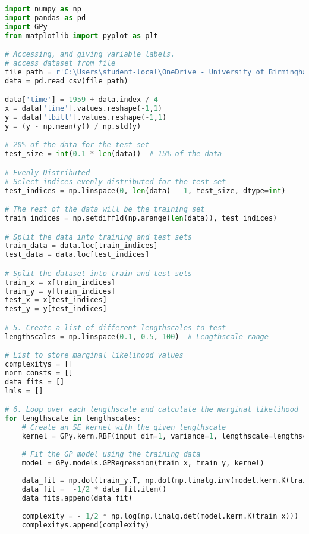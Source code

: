 \documentclass[12pt,a4paper]{article}
\begin{document}
\vspace{10pt}
\begin{lstlisting}[language=python, caption={Code of the Creation of Figure \ref{fig:logml analysis plots}}]
import numpy as np
import pandas as pd
import GPy
from matplotlib import pyplot as plt

# Accessing, and giving variable labels.
# access dataset from file
file_path = r'C:\Users\student-local\OneDrive - University of Birmingham\Dissertation\USMacroB.csv'
data = pd.read_csv(file_path)

data['time'] = 1959 + data.index / 4
x = data['time'].values.reshape(-1,1)
y = data['tbill'].values.reshape(-1,1)
y = (y - np.mean(y)) / np.std(y)

# 20% of the data for the test set
test_size = int(0.1 * len(data))  # 15% of the data

# Evenly Distributed
# Select indices evenly distributed for the test set
test_indices = np.linspace(0, len(data) - 1, test_size, dtype=int)

# The rest of the data will be the training set
train_indices = np.setdiff1d(np.arange(len(data)), test_indices)

# Split the data into training and test sets
train_data = data.loc[train_indices]
test_data = data.loc[test_indices]

# Split the dataset into train and test sets
train_x = x[train_indices]  
train_y = y[train_indices]  
test_x = x[test_indices]    
test_y = y[test_indices]

# 5. Create a list of different lengthscales to test
lengthscales = np.linspace(0.1, 0.5, 100)  # Lengthscale range

# List to store marginal likelihood values
complexitys = []
norm_consts = []
data_fits = []
lmls = []

# 6. Loop over each lengthscale and calculate the marginal likelihood
for lengthscale in lengthscales:
    # Create an SE kernel with the given lengthscale
    kernel = GPy.kern.RBF(input_dim=1, variance=1, lengthscale=lengthscale)
    
    # Fit the GP model using the training data
    model = GPy.models.GPRegression(train_x, train_y, kernel)
    
    data_fit = np.dot(train_y.T, np.dot(np.linalg.inv(model.kern.K(train_x)), train_y))
    data_fit =  -1/2 * data_fit.item()
    data_fits.append(data_fit)
    
    complexity = - 1/2 * np.log(np.linalg.det(model.kern.K(train_x)))
    complexitys.append(complexity)
    

\end{lstlisting}
\end{document}
